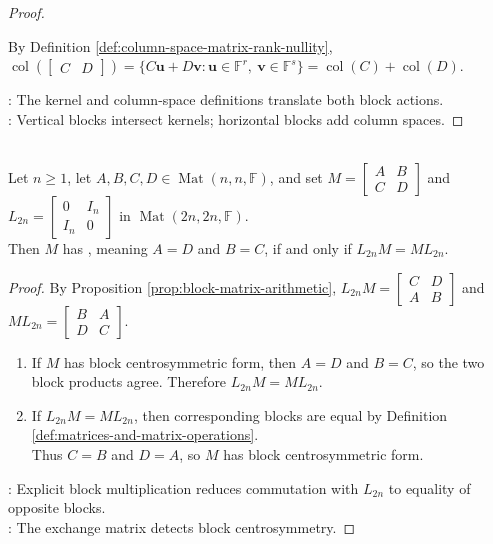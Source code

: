 \begin{proposition}
\begin{proof}
\begin{enumerate}[label=(\roman*)]
By Definition \ref{def:column-space-matrix-rank-nullity}, $\operatorname{col}\!\left(\left[\begin{smallmatrix}C&D\end{smallmatrix}\right]\right)=\{C\mathbf{u}+D\mathbf{v}:\mathbf{u}\in\mathbb{F}^r,\ \mathbf{v}\in\mathbb{F}^s\}=\operatorname{col}(C)+\operatorname{col}(D)$.
\end{enumerate}
: The kernel and column-space definitions translate both block actions.\\
: Vertical blocks intersect kernels; horizontal blocks add column spaces.
\end{proof}
\end{proposition}

\begin{proposition} \label{prop:block-centrosymmetric-commutation} \\
Let $n\geq1$, let $A,B,C,D\in\operatorname{Mat}(n,n,\mathbb{F})$, and set $M=\left[\begin{smallmatrix}A&B\\C&D\end{smallmatrix}\right]$ and $L_{2n}=\left[\begin{smallmatrix}0&I_n\\I_n&0\end{smallmatrix}\right]$ in $\operatorname{Mat}(2n,2n,\mathbb{F})$.\\
Then $M$ has , meaning $A=D$ and $B=C$, if and only if $L_{2n}M=ML_{2n}$.
\begin{proof}
By Proposition \ref{prop:block-matrix-arithmetic}, $L_{2n}M=\left[\begin{smallmatrix}C&D\\A&B\end{smallmatrix}\right]$ and $ML_{2n}=\left[\begin{smallmatrix}B&A\\D&C\end{smallmatrix}\right]$.
\begin{enumerate}[label=\roman*.]
\setlength{\itemsep}{0pt}
\item[$(\Rightarrow)$] If $M$ has block centrosymmetric form, then $A=D$ and $B=C$, so the two block products agree. Therefore $L_{2n}M=ML_{2n}$.
\item[$(\Leftarrow)$] If $L_{2n}M=ML_{2n}$, then corresponding blocks are equal by Definition \ref{def:matrices-and-matrix-operations}.\\
Thus $C=B$ and $D=A$, so $M$ has block centrosymmetric form.
\end{enumerate}
: Explicit block multiplication reduces commutation with $L_{2n}$ to equality of opposite blocks.\\
: The exchange matrix detects block centrosymmetry.
\end{proof}
\end{proposition}

